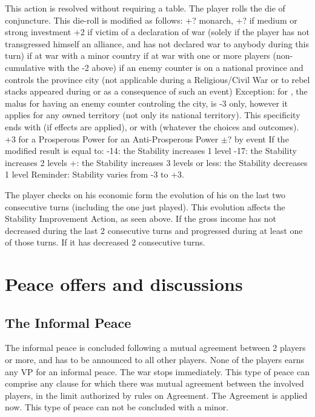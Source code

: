 \aparag[Procedure]
This action is resolved without requiring a table.  The player rolls the die
of conjuncture. This die-roll is modified as follows:
\bparag +? \ADM monarch,
\bparag +? if medium or strong investment
\bparag +2 if victim of a declaration of war (solely if the player has not
transgressed himself an alliance, and has not declared war to anybody during
this turn)
 if at war with a minor country
 if at war with one or more players (non-cumulative with the -2
above)
 if an enemy \ARMY counter is on a national province and controls
the province city (not applicable during a Religious/Civil War or to rebel
stacks appeared during or as a consequence of such an event)
 Exception: for \SPA, the malus for having an enemy \ARMY counter
controling the city, is -3 only, however it applies for any owned territory
(not only its national territory).  This specificity ends
with  (if effects are applied), or with
 (whatever the choices and outcomes).
\bparag +3 for a Prosperous Power
 for an Anti-Prosperous Power
\bparag $\pm$? by event
\aparag[Result]
If the modified result is equal to:
-14: the Stability increases 1 level
-17: the Stability increases 2 levels
+: the Stability increases 3 levels
 or less: the Stability decreases 1 level
\bparag Reminder: Stability varies from -3 to +3.

\aparag[Prosperity]\label{chPeace:Prosperity}
The player checks on his economic form the evolution of his  on the last two consecutive turns (including the one just
played). This evolution affects the Stability Improvement Action, as seen
above.
If the gross income has not decreased during the last 2 consecutive turns and
progressed during at least one of those turns.
If it has decreased 2 consecutive turns.

\section{Peace offers and discussions}\label{chPeace:Peace offers}
\subsection{The Informal Peace}

\aparag The informal peace is concluded following a mutual agreement between 2
players or more, and has to be announced to all other players.
\aparag[Consequences]
None of the players earns any VP for an informal peace. The war stops
immediately.
\bparag This type of peace can comprise any clause for which there was mutual
agreement between the involved players, in the limit authorized by rules on
Agreement. The Agreement is applied now.
\bparag This type of peace can not be concluded with a minor.



